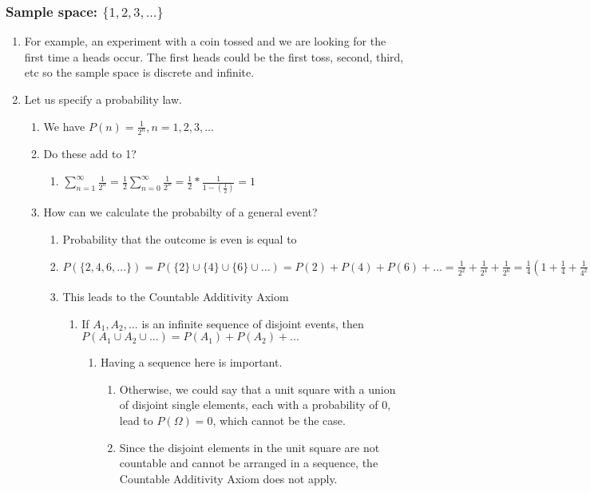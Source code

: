 \documentclass[11pt]{article}
\begin{document}
\subsubsection{Sample space: \(\{1,2,3,...\}\)}
\label{sec:orgc3b5b85}
\begin{enumerate}
\item For example, an experiment with a coin tossed and we are looking for the first time a heads occur. The first heads could be the first toss, second, third, etc so the sample space is discrete and infinite.
\label{sec:org0b8efab}
\item Let us specify a probability law.
\label{sec:org16b170d}
\begin{enumerate}
\item We have \(P(n) = \frac{1}{2^n}, n=1,2,3,...\)
\label{sec:org7cc5937}
\item Do these add to 1?
\label{sec:orgf6b9a05}
\begin{enumerate}
\item \(\sum_{n=1}^{\infty} \frac{1}{2^n} = \frac{1}{2} \sum_{n=0}^{\infty} \frac{1}{2^n} = \frac{1}{2} * \frac{1}{1-(\frac{1}{2})}=1\)
\label{sec:org908b69f}
\end{enumerate}
\item How can we calculate the probabilty of a general event?
\label{sec:org9daea9a}
\begin{enumerate}
\item Probability that the outcome is even is equal to
\label{sec:org4eadff5}
\item \(P(\{2,4,6,...\}) = P(\{2\} \cup \{4\} \cup \{6\} \cup ... ) = P(2)+P(4)+P(6)+... = \frac{1}{2^2} + \frac{1}{2^4} + \frac{1}{2^6} = \frac{1}{4}(1+\frac{1}{4} +\frac{1}{4^2}+...) = \frac{1}{4} \cdot \frac{1}{1-\frac{1}{4}} = \frac{1}{3}\)
\label{sec:org125d593}
\item This leads to the Countable Additivity Axiom
\label{sec:org610da07}
\begin{enumerate}
\item If \(A_1,A_2,...\) is an infinite sequence of disjoint events, then \(P(A_1 \cup A_2 \cup ...) = P(A_1)+P(A_2)+...\)
\label{sec:org70a9e0e}
\begin{enumerate}
\item Having a sequence here is important.
\label{sec:org9e239ee}
\begin{enumerate}
\item Otherwise, we could say that a unit square with a union of disjoint single elements, each with a probability of 0, lead to \(P(\Omega )=0\), which cannot be the case.
\label{sec:org2b904d9}
\item Since the disjoint elements in the unit square are not countable and cannot be arranged in a sequence, the Countable Additivity Axiom does not apply.
\label{sec:org2cb7c43}
\end{enumerate}
\end{enumerate}
\end{enumerate}
\end{enumerate}
\end{enumerate}
\end{enumerate}
\end{document}
